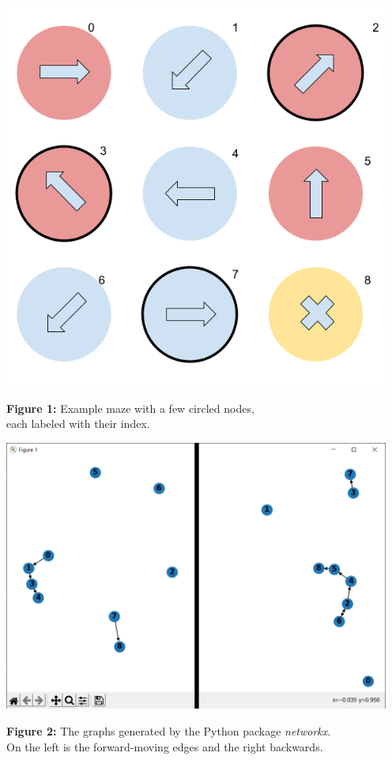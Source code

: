 \documentclass[12pt]{article}
\begin{document}
\begin{center}
    \includegraphics[width=5in]{examplemaze.png}

    \textbf{Figure 1:} Example maze with a few circled nodes,\\
    each labeled with their index.

    \includegraphics[width=5in]{graphs.png}

    \textbf{Figure 2:} The graphs generated by the Python package 
    \emph{networkx}.\\On the left is the forward-moving edges and the
    right backwards.
\end{center}
\end{document}
